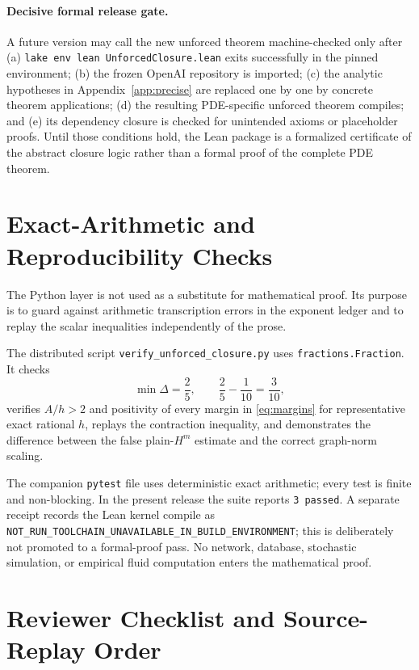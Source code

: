 \documentclass[11pt]{article}
\numberwithin{equation}{section}
\begin{document}
\paragraph{Decisive formal release gate.}
A future version may call the new unforced theorem machine-checked only after (a) \texttt{lake env lean UnforcedClosure.lean} exits successfully in the pinned environment; (b) the frozen OpenAI repository is imported; (c) the analytic hypotheses in Appendix~\ref{app:precise} are replaced one by one by concrete theorem applications; (d) the resulting PDE-specific unforced theorem compiles; and (e) its dependency closure is checked for unintended axioms or placeholder proofs.  Until those conditions hold, the Lean package is a formalized certificate of the abstract closure logic rather than a formal proof of the complete PDE theorem.

\section{Exact-Arithmetic and Reproducibility Checks}\label{app:python}

The Python layer is not used as a substitute for mathematical proof.  Its purpose is to guard against arithmetic transcription errors in the exponent ledger and to replay the scalar inequalities independently of the prose.

The distributed script \texttt{verify\_unforced\_closure.py} uses \texttt{fractions.Fraction}.  It checks
\begin{equation}
\min\Delta=\frac25,
\qquad
\frac25-\frac1{10}=\frac3{10},
\label{eq:pytest1}
\end{equation}
verifies \(A/h>2\) and positivity of every margin in \eqref{eq:margins} for representative exact rational \(h\), replays the contraction inequality, and demonstrates the difference between the false plain-\(H^m\) estimate and the correct graph-norm scaling.

The companion \texttt{pytest} file uses deterministic exact arithmetic; every test is finite and non-blocking.  In the present release the suite reports \texttt{3 passed}.  A separate receipt records the Lean kernel compile as \texttt{NOT\_RUN\_TOOLCHAIN\_UNAVAILABLE\_IN\_BUILD\_ENVIRONMENT}; this is deliberately not promoted to a formal-proof pass.  No network, database, stochastic simulation, or empirical fluid computation enters the mathematical proof.

\section{Reviewer Checklist and Source-Replay Order}\label{app:review}
\end{document}
